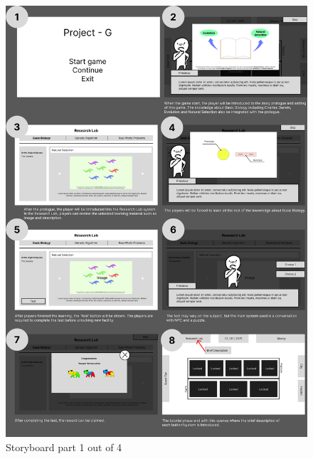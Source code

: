\documentclass[12pt,oneside,openright,a4paper]{cpe-english-project}
\begin{document}
\begin{figure}[!h]\centering \includegraphics[width=14cm]{appendix-a-figure/storyboard1.png} \caption{Storyboard part 1 out of 4} \end{figure}
\newpage
\end{document}

